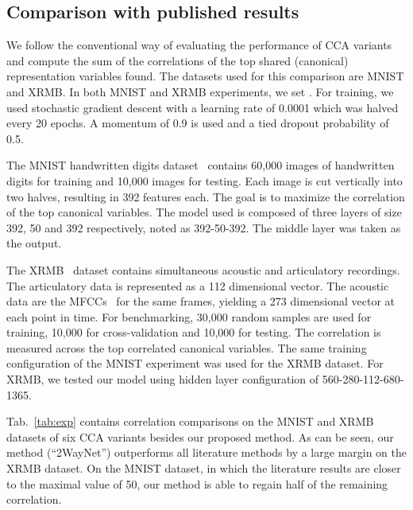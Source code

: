 \documentclass[10pt,twocolumn,letterpaper]{article}
\begin{document}
\subsection{Comparison with published results}
We follow the conventional way of evaluating the performance of CCA variants and compute the sum of the correlations of the top  shared (canonical) representation variables found. The datasets used for this comparison are MNIST and XRMB. In both MNIST and XRMB experiments, we set . For training, we used stochastic gradient descent with a learning rate of 0.0001 which was halved every 20 epochs. A momentum of 0.9 is used and a tied dropout probability of 0.5. 

 The MNIST handwritten digits dataset~\cite{mnist} contains 60,000 images of handwritten digits for training and 10,000 images for testing. 
Each image is cut vertically into two halves, resulting in 392 features each. The goal is to maximize the correlation of the top  canonical variables. The model used is composed of three layers of size 392, 50 and 392 respectively, noted as 392-50-392. The middle layer was taken as the output. 

 The XRMB~\cite{xrmb} dataset contains simultaneous acoustic and articulatory recordings. The articulatory data is represented as a 112 dimensional vector. The acoustic data are the MFCCs~\cite{logan2000mel} for the same frames, yielding a 273 dimensional vector at each point in time. For benchmarking, 30,000 random samples are used for training, 10,000 for cross-validation and 10,000 for testing. The correlation is measured across the  top correlated canonical variables. The same training configuration of the MNIST experiment was used for the XRMB dataset. For XRMB, we tested our model using hidden layer configuration of 560-280-112-680-1365. 

Tab.~\ref{tab:exp} contains correlation comparisons on the MNIST and XRMB datasets of six CCA variants besides our proposed method. As can be seen, our method (``2WayNet'') outperforms all literature methods by a large margin on the XRMB dataset. On the MNIST dataset, in which the literature results are closer to the maximal value of 50, our method is able to regain half of the remaining correlation. 
\end{document}
